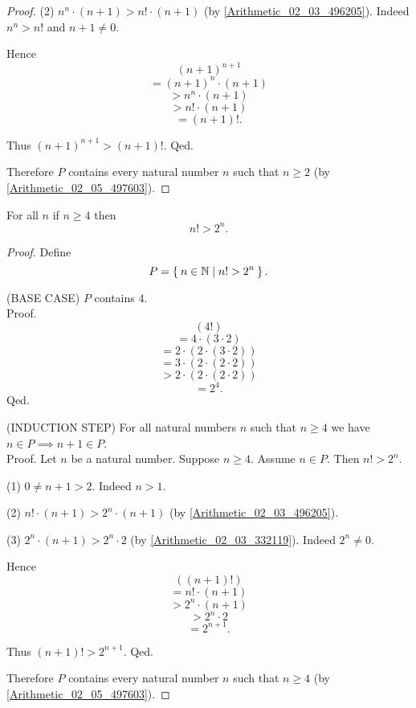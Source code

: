 \documentclass[../../arithmetic.ftl.tex]{subfiles}
\begin{document}
\begin{forthel}
\begin{proof}
        (2) $n^{n} \cdot (n + 1) > n! \cdot (n + 1)$ (by \ref{Arithmetic_02_03_496205}).
        Indeed $n^{n} > n!$ and $n + 1 \neq 0$.

        Hence
        \[   (n + 1)^{n + 1} \]
        \[ = (n + 1)^{n} \cdot (n + 1) \]
        \[ > n^{n} \cdot (n + 1) \]
        \[ > n! \cdot (n + 1) \]
        \[ = (n + 1)!. \]

        Thus $(n + 1)^{n + 1} > (n + 1)!$.
      Qed.

      Therefore $P$ contains every natural number $n$ such that $n \geq 2$ (by \ref{Arithmetic_02_05_497603}).
    \end{proof}


    \begin{proposition}\label{Arithmetic_02_06_493411}
      For all $n$ if $n \geq 4$ then \[ n! > 2^{n}. \]
    \end{proposition}
    \begin{proof}
      Define \[ P = \Set{n \in \mathbb{N} | n! > 2^{n}}. \]

      (BASE CASE) $P$ contains $4$. \\
      Proof.
        \[   (4!) \]
        \[ = 4 \cdot (3 \cdot 2) \]
        \[ = 2 \cdot (2 \cdot (3 \cdot 2)) \]
        \[ = 3 \cdot (2 \cdot (2 \cdot 2)) \]
        \[ > 2 \cdot (2 \cdot (2 \cdot 2)) \]
        \[ = 2^{4}. \]
      Qed.

      (INDUCTION STEP) For all natural numbers $n$ such that $n \geq 4$ we have $n \in P \implies n + 1 \in P$. \\
      Proof.
        Let $n$ be a natural number.
        Suppose $n \geq 4$.
        Assume $n \in P$.
        Then $n! > 2^{n}$.

        (1) $0 \neq n + 1 > 2$.
        Indeed $n > 1$.

        (2) $n! \cdot (n + 1) > 2^{n} \cdot (n + 1)$ (by \ref{Arithmetic_02_03_496205}).

        (3) $2^{n} \cdot (n + 1) > 2^{n} \cdot 2$ (by \ref{Arithmetic_02_03_332119}).
        Indeed $2^{n} \neq 0$.

        Hence
        \[   ((n + 1)!) \]
        \[ = n! \cdot (n + 1) \]
        \[ > 2^{n} \cdot (n + 1) \]
        \[ > 2^{n} \cdot 2 \]
        \[ = 2^{n + 1}. \]

        Thus $(n + 1)! > 2^{n + 1}$.
      Qed.

      Therefore $P$ contains every natural number $n$ such that $n \geq 4$ (by \ref{Arithmetic_02_05_497603}).
    \end{proof}
  \end{forthel}
\end{document}
